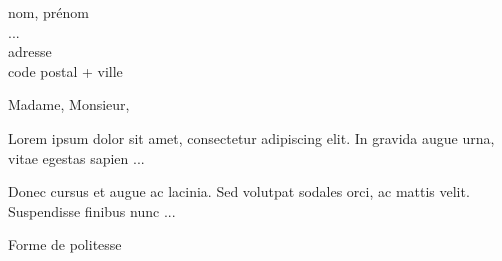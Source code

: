 \documentclass[11pt]{lettre}
\begin{document}
 
    \begin{letter}{nom, prénom\\
                    ...\\ 
                    adresse \\
                    code postal + ville
                    }
                    
        
        \nolieu %
        \address{adresse \\
                code postal + ville}
        \nofax


        \signature{prénom + nom}  %
        
        \opening{Madame, Monsieur,}
        
            Lorem ipsum dolor sit amet, consectetur adipiscing elit. In gravida augue urna, vitae egestas sapien ...

            Donec cursus et augue ac lacinia. Sed volutpat sodales orci, ac mattis velit. Suspendisse finibus nunc ...

          
        \closing{Forme de politesse}
        
    \end{letter}
\end{document}
